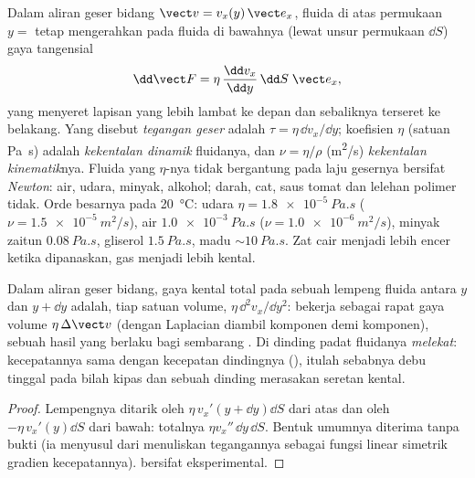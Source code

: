 \begin{definition}\label{def:b2:viscous-flows:viscosity}
Dalam aliran geser bidang $\vect v = v_x(y)\,\vect e_x$, fluida di atas
permukaan $y =$ tetap mengerahkan pada fluida di bawahnya (lewat unsur
permukaan $\dd S$) gaya tangensial
\[
\dd\vect F = \eta\,\frac{\dd v_x}{\dd y}\,\dd S\;\vect e_x ,
\]
yang menyeret lapisan yang lebih lambat ke depan dan sebaliknya terseret
ke belakang. Yang disebut \emph{tegangan geser} adalah $\tau = \eta\,\dd v_x/\dd y$; koefisien
$\eta$ (satuan \unit{Pa.s}) adalah \emph{kekentalan dinamik} fluidanya,
dan $\nu = \eta/\rho$ (\unit{m^2/s}) \emph{kekentalan kinematik}nya. Fluida
yang $\eta$-nya tidak bergantung pada laju gesernya bersifat \emph{Newton}:
air, udara, minyak, alkohol; darah, cat, saus tomat dan lelehan polimer
tidak. Orde besarnya pada \qty{20}{\degreeCelsius}: udara $\eta =
\qty{1.8e-5}{Pa.s}$ ($\nu = \qty{1.5e-5}{m^2/s}$), air $\qty{1.0e-3}{Pa.s}$
($\nu = \qty{1.0e-6}{m^2/s}$), minyak zaitun $\qty{0.08}{Pa.s}$, gliserol
$\qty{1.5}{Pa.s}$, madu $\sim\qty{10}{Pa.s}$. Zat cair menjadi lebih encer
ketika dipanaskan, gas menjadi lebih kental.
\end{definition}

\begin{proposition}\label{prop:b2:viscous-flows:density}
Dalam aliran geser bidang, gaya kental total pada sebuah lempeng fluida
antara $y$ dan $y + \dd y$ adalah, tiap satuan volume, $\eta\,\dd^2v_x/\dd y^2$:
 bekerja sebagai rapat gaya volume $\eta\,\Delta\vect v$ (dengan
Laplacian diambil komponen demi komponen), sebuah hasil yang berlaku bagi
sembarang . Di dinding padat fluidanya
\emph{melekat}: kecepatannya sama dengan kecepatan dindingnya (\emph{}), itulah sebabnya debu tinggal pada bilah kipas dan sebuah
dinding merasakan seretan kental.
\end{proposition}

\begin{proof}
Lempengnya ditarik oleh $\eta\,v_x'(y + \dd y)\dd S$ dari atas dan oleh
$-\eta\,v_x'(y)\dd S$ dari bawah: totalnya $\eta v_x''\,\dd y\,\dd S$. Bentuk
umumnya diterima tanpa bukti (ia menyusul dari menuliskan tegangannya
sebagai fungsi linear simetrik gradien kecepatannya).  bersifat eksperimental.
\end{proof}

